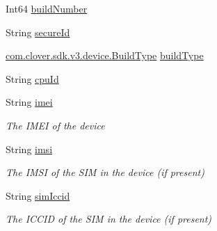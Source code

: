 \begin{DoxyCompactItemize}
\item 
Int64 \hyperlink{classcom_1_1clover_1_1sdk_1_1v3_1_1device_1_1_device_ad81654d7d129ff8b96a42099adbbbf41}{build\+Number}
\item 
String \hyperlink{classcom_1_1clover_1_1sdk_1_1v3_1_1device_1_1_device_aab34d023b0c9b75f452df83e71d9482a}{secure\+Id}
\item 
\hyperlink{namespacecom_1_1clover_1_1sdk_1_1v3_1_1device_a8dd97d0ddba1e91704a7c44c7d27eb85}{com.\+clover.\+sdk.\+v3.\+device.\+Build\+Type} \hyperlink{classcom_1_1clover_1_1sdk_1_1v3_1_1device_1_1_device_adf0001b9ed73c91f3cea9a78602a09bb}{build\+Type}
\item 
String \hyperlink{classcom_1_1clover_1_1sdk_1_1v3_1_1device_1_1_device_a2646eab991e7d3c82c2af497fccca723}{cpu\+Id}
\item 
String \hyperlink{classcom_1_1clover_1_1sdk_1_1v3_1_1device_1_1_device_a4931f8c1872efdca3d12fb00007807a3}{imei}
\begin{DoxyCompactList}\small\item\em The I\+M\+EI of the device \end{DoxyCompactList}\item 
String \hyperlink{classcom_1_1clover_1_1sdk_1_1v3_1_1device_1_1_device_ab66c0e97226b4f424c2729b3f916f9a6}{imsi}
\begin{DoxyCompactList}\small\item\em The I\+M\+SI of the S\+IM in the device (if present) \end{DoxyCompactList}\item 
String \hyperlink{classcom_1_1clover_1_1sdk_1_1v3_1_1device_1_1_device_a240e710013c15c7b0457db77446a2594}{sim\+Iccid}
\begin{DoxyCompactList}\small\item\em The I\+C\+C\+ID of the S\+IM in the device (if present) \end{DoxyCompactList}\item 

\end{DoxyCompactItemize}
